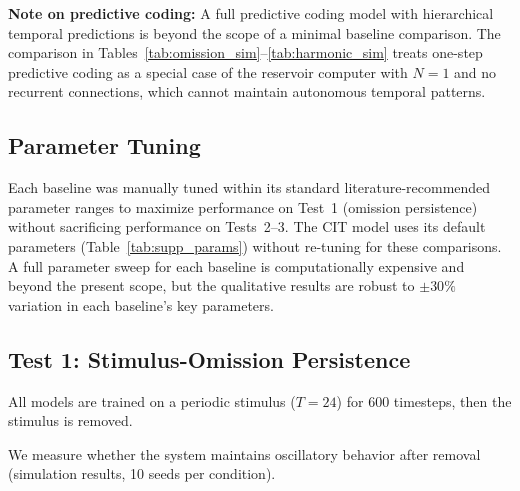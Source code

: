 \documentclass[12pt,a4paper]{article}
\begin{document}
\textbf{Note on predictive coding:} A full predictive coding model with hierarchical temporal predictions is beyond the scope of a minimal baseline comparison. The comparison in Tables~\ref{tab:omission_sim}--\ref{tab:harmonic_sim} treats one-step predictive coding as a special case of the reservoir computer with $N=1$ and no recurrent connections, which cannot maintain autonomous temporal patterns.



\subsection{Parameter Tuning}



Each baseline was manually tuned within its standard literature-recommended parameter ranges to maximize performance on Test~1 (omission persistence) without sacrificing performance on Tests~2--3. The CIT model uses its default parameters (Table~\ref{tab:supp_params}) without re-tuning for these comparisons. A full parameter sweep for each baseline is computationally expensive and beyond the present scope, but the qualitative results are robust to $\pm 30\%$ variation in each baseline's key parameters.



\subsection{Test 1: Stimulus-Omission Persistence}



All models are trained on a periodic stimulus ($T=24$) for 600 timesteps, then the stimulus is removed.

We measure whether the system maintains oscillatory behavior after removal (simulation results, 10 seeds per condition).
\end{document}
